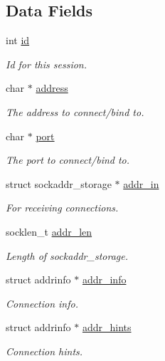 \subsection*{Data Fields}
\begin{DoxyCompactItemize}
\item 
int \hyperlink{structtb__session__t_a7441ef0865bcb3db9b8064dd7375c1ea}{id}
\begin{DoxyCompactList}\small\item\em Id for this session. \end{DoxyCompactList}\item 
char $\ast$ \hyperlink{structtb__session__t_a879a8cdf605d02f8af8b2e216b8764f2}{address}
\begin{DoxyCompactList}\small\item\em The address to connect/bind to. \end{DoxyCompactList}\item 
char $\ast$ \hyperlink{structtb__session__t_add99ba4ea70b8f66170823cad9a55fa4}{port}
\begin{DoxyCompactList}\small\item\em The port to connect/bind to. \end{DoxyCompactList}\item 
struct sockaddr\-\_\-storage $\ast$ \hyperlink{structtb__session__t_ab617a1bfa381136f3c0811b771c618e9}{addr\-\_\-in}
\begin{DoxyCompactList}\small\item\em For receiving connections. \end{DoxyCompactList}\item 
socklen\-\_\-t \hyperlink{structtb__session__t_a116941d922ae354d7241d04b0f3c84d8}{addr\-\_\-len}
\begin{DoxyCompactList}\small\item\em Length of sockaddr\-\_\-storage. \end{DoxyCompactList}\item 
struct addrinfo $\ast$ \hyperlink{structtb__session__t_aab742bc33815bd69bf49ad1861006b97}{addr\-\_\-info}
\begin{DoxyCompactList}\small\item\em Connection info. \end{DoxyCompactList}\item 
struct addrinfo $\ast$ \hyperlink{structtb__session__t_a105521cb94384edeaace1a1ce7b3d7c7}{addr\-\_\-hints}
\begin{DoxyCompactList}\small\item\em Connection hints. \end{DoxyCompactList}\item 

\end{DoxyCompactItemize}
